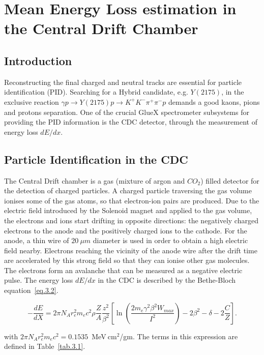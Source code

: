 \section{Mean Energy Loss estimation in the Central Drift Chamber}
\label{p3}

\subsection{Introduction}

Reconstructing the final charged and neutral tracks are essential for particle identification (PID). Searching for a Hybrid candidate, e.g. $Y(2175)$, in the exclusive reaction $\gamma p \rightarrow Y(2175) p \rightarrow K^{+}K^{-}\pi^{+}\pi^{-}p$ demands a good kaons, pions and protons separation. One of the crucial GlueX spectrometer subsystems for providing the PID information is the CDC detector, through the measurement of energy loss $dE/dx$.

\subsection{Particle Identification in the CDC}

The Central Drift chamber is a gas (mixture of argon and $CO_{2}$) filled detector for the detection of charged particles. A charged particle traversing the gas volume ionises some of the gas atoms, so that electron-ion pairs are produced. Due to the electric field introduced by the Solenoid magnet and applied to the gas volume, the electrons and ions start drifting in opposite directions: the negatively charged electrons to the anode and the positively charged ions to the cathode. For the anode, a thin wire of $20~\mu m$ diameter is used in order to obtain a high electric field nearby. Electrons reaching the vicinity of the anode wire after the drift time are accelerated by this strong field so that they can ionise other gas molecules. The electrons form an avalanche that can be measured as a negative electric pulse. 
The energy loss $dE/dx$ in the CDC is described by the Bethe-Bloch equation~\ref{eq.3.2}.

\begin{equation}
    \label{eq.3.2}
    -\frac{dE}{dX} = 2 \pi N_A r_e^2 m_e c^2 \rho \frac{Z}{A} \frac{z^2}{\beta^2} \left [ \ln \left( \frac{2 m_e \gamma^2 \beta^2 W_{max}}{I^2} \right) - 2 \beta^2 - \delta - 2\frac{C}{Z} \right].
\end{equation}

\noindent
with $2 \pi N_A r_e^2 m_e c^2 = 0.1535$~MeV$~\!$cm$^2$/gm. The terms in this expression are defined in Table~\ref{tab.3.1}.

